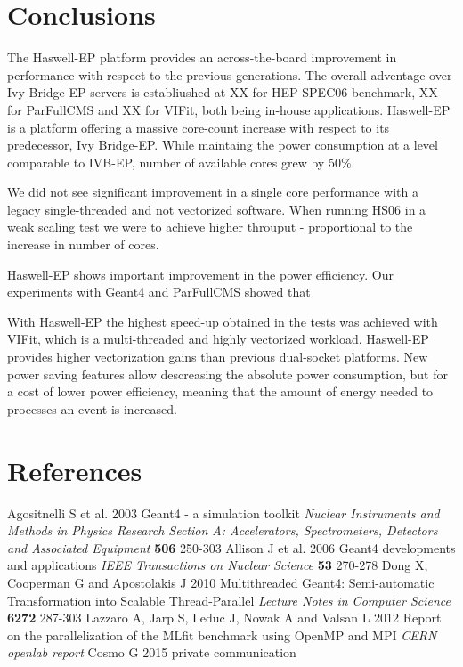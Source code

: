 \documentclass[a4paper]{jpconf}
\begin{document}
\section{Conclusions}
The Haswell-EP platform provides an across-the-board improvement in performance with respect to the previous generations. The overall adventage over Ivy Bridge-EP servers is establiushed at XX for HEP-SPEC06 benchmark, XX for ParFullCMS and XX for VIFit, both being in-house applications.
Haswell-EP is a platform offering a massive core-count increase with respect to its predecessor, Ivy Bridge-EP. While maintaing the power consumption at a level comparable to IVB-EP, number of available cores grew by 50\%.

We did not see significant improvement in a single core performance with a legacy single-threaded and not vectorized software. When running HS06 in a weak scaling test we were to achieve higher throuput - proportional to the increase in number of cores.

Haswell-EP shows important improvement in the power efficiency. Our experiments with Geant4 and ParFullCMS showed that

With Haswell-EP the highest speed-up obtained in the tests was achieved with VIFit, which is a multi-threaded and highly vectorized workload.
Haswell-EP provides higher vectorization gains than previous dual-socket platforms.
New power saving features allow descreasing the absolute power consumption, but for a cost of lower power efficiency, meaning that the amount of energy needed to processes an event is increased.

\section*{References}

\begin{thebibliography}{dupa}
 Agositnelli S et al. 2003 Geant4 - a simulation toolkit \textit{Nuclear Instruments and Methods in Physics Research Section A: Accelerators, Spectrometers, Detectors and Associated Equipment} \textbf{506} 250-303
 Allison J et al. 2006 Geant4 developments and applications \textit{IEEE Transactions on Nuclear Science} \textbf{53} 270-278
 Dong X, Cooperman G and Apostolakis J 2010 Multithreaded Geant4: Semi-automatic Transformation into Scalable Thread-Parallel \textit{Lecture Notes in Computer Science} \textbf{6272} 287-303
 Lazzaro A, Jarp S, Leduc J, Nowak A and Valsan L 2012 Report on the parallelization of the MLfit benchmark using OpenMP and MPI \textit{CERN openlab report}
 Cosmo G 2015 private communication
\end{thebibliography}
\end{document}
